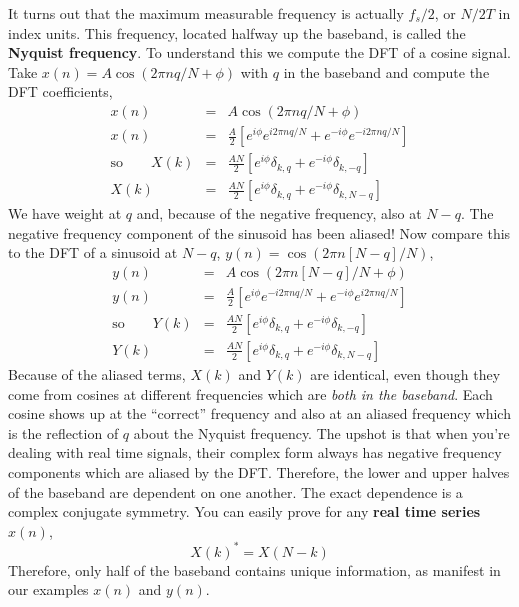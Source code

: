 It turns out that the maximum measurable frequency is actually $f_s/2$, or $N/2T$ in index units. This frequency, located halfway up the baseband, is called the \textbf{Nyquist frequency}. To understand this we compute the DFT of a cosine signal. Take $x(n)=A\cos (2\pi nq/N+\phi)$ with $q$ in the baseband and compute the DFT coefficients,
\begin{eqnarray*}
x(n) & = & A\cos\left(2\pi nq/N+\phi \right)\\
x(n) & = & \frac{A}{2}\left[e^{i\phi}e^{i2\pi nq/N}+e^{-i\phi}e^{-i2\pi nq/N}\right]\\
\text{so}\qquad X(k) & = & \frac{AN}{2}\left[e^{i\phi}\delta_{k,q}+e^{-i\phi}\delta_{k,-q}\right]\\
X(k) & = & \frac{AN}{2}\left[e^{i\phi}\delta_{k,q}+e^{-i\phi}\delta_{k,N-q}\right]\end{eqnarray*}
We have weight at $q$ and, because of the negative frequency, also at $N-q$. The negative frequency component of the sinusoid has been aliased! Now compare this to the DFT of a sinusoid at $N-q$, $y(n)=\cos(2\pi n[N-q]/N)$,
\begin{eqnarray*}
y(n) & = & A\cos\left(2\pi n[N-q]/N+\phi\right)\\
y(n) & = & \frac{A}{2}\left[e^{i\phi}e^{-i2\pi nq/N}+e^{-i\phi}e^{i2\pi nq/N}\right]\\
\text{so}\qquad Y(k) & = & \frac{AN}{2}\left[e^{i\phi}\delta_{k,q}+e^{-i\phi}\delta_{k,-q}\right]\\
Y(k) & = & \frac{AN}{2}\left[e^{i\phi}\delta_{k,q}+e^{-i\phi}\delta_{k,N-q}\right]
\end{eqnarray*}
Because of the aliased terms, $X(k)$ and $Y(k)$ are identical, even though they come from cosines at different frequencies which are \emph{both in the baseband}. Each cosine shows up at the ``correct'' frequency and also at an aliased frequency which is the reflection of $q$ about the Nyquist frequency. The upshot is that when you're dealing with real time signals, their complex form always has negative frequency components which are aliased by the DFT. Therefore, the lower and upper halves of the baseband are dependent on one another. The exact dependence is a complex conjugate symmetry. You can easily prove for any \textbf{real time series} $x(n)$,
\begin{equation}
X(k)^* = X(N-k) \label{eq:conjugateSymmetry}
\end{equation}
Therefore, only half of the baseband contains unique information, as manifest in our examples $x(n)$ and $y(n)$.

